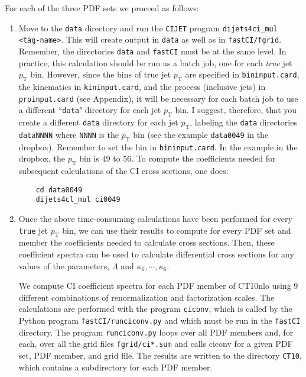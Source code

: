 \documentclass[aps,prd,preprint,nofootinbib]{revtex4}
\begin{document}
For each of the three PDF sets we proceed
as follows: 
	\begin{enumerate}
	\item Move to the {\tt data} directory and run the {\tt CIJET} program {\tt dijets4ci\_mul <tag-name>}. This will  create output in {\tt data} as well as 
	in {\tt fastCI/fgrid}. Remember, the directories {\tt data} and {\tt fastCI} must be at the same level. In practice, this calculation should be run as a batch job, one for each \emph{true}  jet $p_\text{T}$ bin. However, since the bins of true jet $p_\textrm{T}$ are specified in 
	{\tt bininput.card},
	the kinematics in {\tt kininput.card}, and the process (inclusive jets) in {\tt proinput.card} (see Appendix), it will be necessary for each batch job to use a different ``{\tt data}" 
	directory for each jet $p_\text{T}$
	bin. I suggest, therefore, that you create a different {\tt data} directory for each jet $p_\text{T}$, labeling the {\tt data} directories {\tt dataNNNN} where {\tt NNNN} is the  $p_\text{T}$
	bin (see the example {\tt data0049} in the dropbox). Remember to set the bin in
	{\tt bininput.card}.  In the example in the dropbox, the $p_\text{T}$ bin is 49 to 56. To compute 
	the coefficients needed for subsequent  calculations of the CI cross sections, one does:
	\begin{verbatim}
	cd data0049
	dijets4cl_mul ci0049
	\end{verbatim}
	
	\item 
	Once the above time-consuming calculations have been performed for every {\tt true} jet $p_\text{T}$ bin, we can use
	their results to compute for every PDF set and member  the coefficients needed to
	calculate cross sections. Then, these coefficient spectra can be used to calculate differential
	cross sections for any values of the parameters, $\Lambda$ and $\kappa_1,\cdots,\kappa_6$.
	
	We compute CI coefficient spectra for each PDF member of CT10nlo using 9 different 
combinations of renormalization and factorization scales. The calculations are performed with
the program {\tt ciconv}, which is called by the Python program {\tt fastCI/runciconv.py} and which must be run
in the {\tt fastCI} directory. The program {\tt runciconv.py} loops over all PDF members and, for each,
over all the grid files {\tt fgrid/ci*.sum} and calls {ciconv} for a given PDF set, PDF member, and grid file.
The results are written to the directory {\tt CT10}, which contains a subdirectory for each PDF member.
	\end{enumerate}
\end{document}
